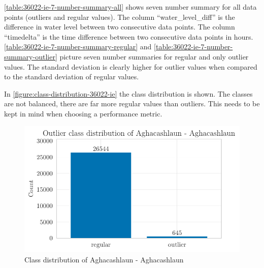 \autoref{table:36022-ie-7-number-summary-all} shows seven number summary for all data points (outliers and regular values). The column ``water\_level\_diff'' is the difference in water level between two consecutive data points. The column ``timedelta'' is the time difference between two consecutive data points in hours. \autoref{table:36022-ie-7-number-summary-regular} and \autoref{table:36022-ie-7-number-summary-outlier} picture seven number summaries for regular and only outlier values. The standard deviation is clearly higher for outlier values when compared to the standard deviation of regular values.




In \autoref{figure:class-distribution-36022-ie} the class distribution is shown. The classes are not balanced, there are far more regular values than outliers. This needs to be kept in mind when choosing a performance metric.
\begin{figure}[htp]
    \centering
    \includegraphics{./plots/pdfs/36022-ie/outlier_class_distribution_36022-ie.pdf}
    \caption{Class distribution of Aghacashlaun - Aghacashlaun}
    \label{figure:class-distribution-36022-ie}
\end{figure}

